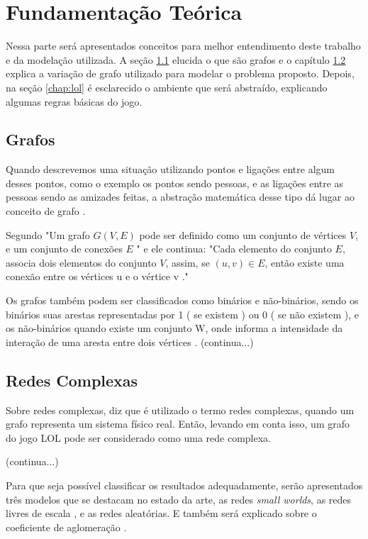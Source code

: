 \chapter{Fundamentação Teórica}
\label{chap:fundteorica}
Nessa parte será apresentados conceitos para melhor entendimento deste trabalho e da modelação utilizada. 
A seção \ref{chap:grafos} elucida o que são grafos e o capítulo \ref{chap:redecomplexa} explica a variação de grafo utilizado para modelar o problema proposto. Depois, na seção \ref{chap:lol} é esclarecido o ambiente que será abstraído, explicando algumas regras básicas do jogo.
\section{Grafos}
\label{chap:grafos}

Quando descrevemos uma situação utilizando pontos e ligações entre algum desses pontos, como o exemplo os pontos sendo pessoas, e as ligações entre as pessoas sendo as amizades feitas, a abstração matemática desse tipo dá lugar ao conceito de grafo \cite{Lucchesi1979}.

Segundo \citet{Viana2007} "Um grafo \(G(V, E)\) pode ser definido como um conjunto de vértices \(V\), e um conjunto de conexões \(E\) " e ele continua: "Cada elemento do conjunto \(E\), associa dois elementos do conjunto \(V\), assim, se \((u,v) \in E\), então existe uma conexão entre os vértices u e o vértice v ."

Os grafos também podem ser classificados como binários e não-binários, sendo os binários suas arestas representadas por 1 ( se existem ) ou 0 ( se não existem ), e os não-binários quando existe um conjunto W, onde informa a intensidade da interação de uma aresta entre dois vértices  \cite{Viana2007}.
(continua...)    

\section{Redes Complexas}
\label{chap:redecomplexa}
Sobre redes complexas, \citet{Viana2007} diz que é utilizado o termo redes complexas, quando um grafo representa um sistema físico real.  Então, levando em conta isso, um grafo do jogo LOL pode ser considerado como uma rede complexa.

(continua...)

Para que seja possível classificar os resultados adequadamente, serão apresentados três modelos que se destacam no estado da arte, as redes \textit{small worlds}, as redes livres de escala \citep{Albert2002}, e as redes aleatórias. E também será explicado sobre o coeficiente de aglomeração .

